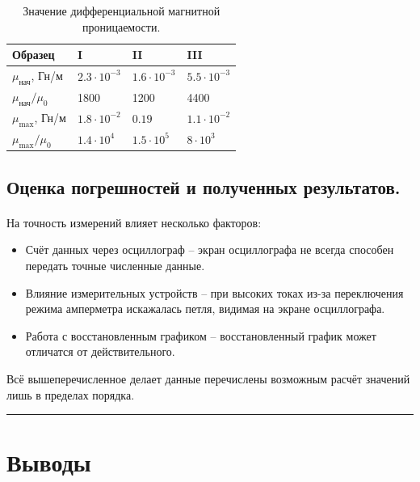 \documentclass[a4paper,12pt]{article} %
\begin{document}
\begin{table}
\begin{center}
\begin{tabularx}{0.8\textwidth}{|l|X|X|X|}
\hline
Образец & I & II & III \\ \hline
$\mu_\text{нач}$, Гн/м & $2.3 \cdot 10^{-3}$ & $1.6 \cdot 10^{-3}$ & $5.5 \cdot 10^{-3}$ \\ \hline
$\mu_\text{нач} / \mu_0$ & 1800 & 1200 & 4400 \\ \hline
$\mu_\text{max}$, Гн/м & $1.8 \cdot 10^{-2}$ & $0.19$ & $1.1 \cdot 10^{-2}$ \\ \hline
$\mu_\text{max} / \mu_0$ & $1.4 \cdot 10^{4}$ & $1.5 \cdot 10^{5}$ & $8 \cdot 10^{3}$ \\ \hline

\end{tabularx}
\caption{Значение дифференциальной магнитной проницаемости.}
\end{center}
\end{table}

\subsection{Оценка погрешностей и полученных результатов.}

\paragraph{} На точность измерений влияет несколько факторов:

\begin{itemize}
\item Счёт данных через осциллограф -- экран осциллографа не всегда способен передать точные численные данные.
\item Влияние измерительных устройств -- при высоких токах из-за переключения режима амперметра искажалась петля, видимая на экране осциллографа.
\item Работа с восстановленным графиком -- восстановленный график может отличатся от действительного.
\end{itemize} 

Всё вышеперечисленное делает данные перечислены возможным расчёт значений лишь в пределах порядка.

\medskip\hrule\medskip

\section{Выводы}
\end{document}
